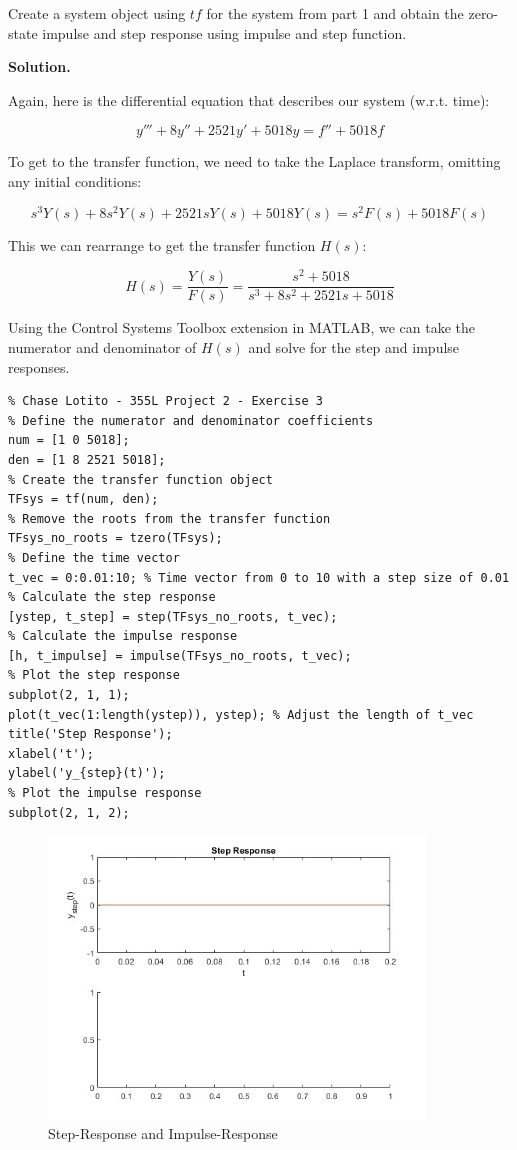\documentclass{article}
\begin{document}
Create a system object using \(tf\) for the system from part 1 and obtain the zero-state impulse and step response using impulse and step function.

\bigskip

\textbf{Solution.}

\bigskip

Again, here is the differential equation that describes our system (w.r.t. time):

\begin{equation} 
    y''' + 8y'' + 2521y' + 5018y = f'' + 5018f
\end{equation}

To get to the transfer function, we need to take the Laplace transform, omitting any initial conditions:


\begin{equation} 
    s^3 Y(s) + 8s^2 Y(s) + 2521s Y(s) + 5018 Y(s) = s^2 F(s) + 5018 F(s)
\end{equation}

This we can rearrange to get the transfer function \(H(s)\):

\begin{equation}
    H(s) = \frac{Y(s)}{F(s)} = \frac{s^2 + 5018}{s^3 + 8 s^2 + 2521 s + 5018}
\end{equation}

Using the Control Systems Toolbox extension in MATLAB, we can take the numerator and denominator of \(H(s)\) and solve for the step and impulse responses.

\begin{lstlisting}
% Chase Lotito - 355L Project 2 - Exercise 3
% Define the numerator and denominator coefficients
num = [1 0 5018];
den = [1 8 2521 5018];
% Create the transfer function object
TFsys = tf(num, den);
% Remove the roots from the transfer function
TFsys_no_roots = tzero(TFsys);
% Define the time vector
t_vec = 0:0.01:10; % Time vector from 0 to 10 with a step size of 0.01
% Calculate the step response
[ystep, t_step] = step(TFsys_no_roots, t_vec);
% Calculate the impulse response
[h, t_impulse] = impulse(TFsys_no_roots, t_vec);
% Plot the step response
subplot(2, 1, 1);
plot(t_vec(1:length(ystep)), ystep); % Adjust the length of t_vec
title('Step Response');
xlabel('t');
ylabel('y_{step}(t)');
% Plot the impulse response
subplot(2, 1, 2);
\end{lstlisting}

\begin{figure}[!ht] 
    \centering
    \includegraphics[width = 10cm]{q3.jpg}
    \caption{Step-Response and Impulse-Response}
    \label{fig:q3}
\end{figure}
\end{document}
